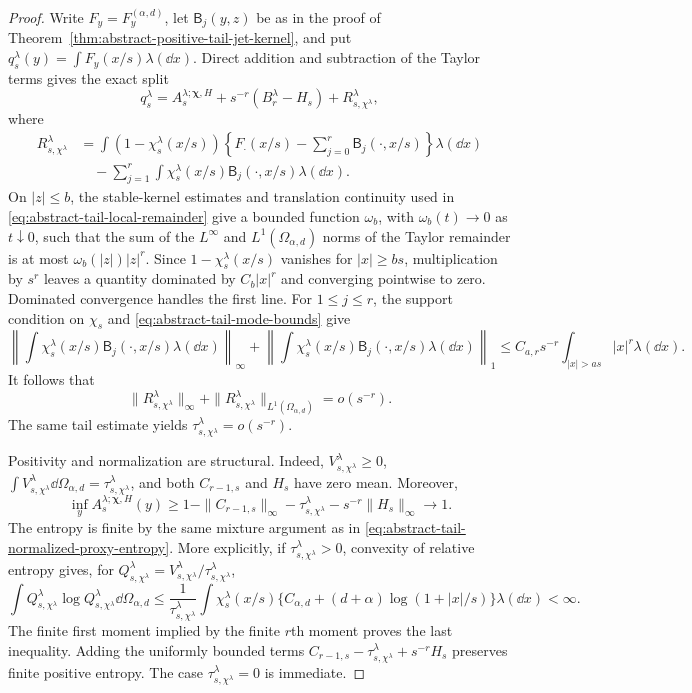 \begin{proof}
Write \(F_y=F_y^{(\alpha,d)}\), let \(\mathsf B_j(y,z)\) be as in the proof
of Theorem~\ref{thm:abstract-positive-tail-jet-kernel}, and put
\(q_s^\lambda(y)=\int F_y(x/s)\lambda(\dd x)\).  Direct addition and
subtraction of the Taylor terms gives the exact split
\[
 q_s^\lambda=A_s^{\lambda;\boldsymbol\chi,H}
  +s^{-r}(B_r^\lambda-H_s)+R_{s,\chi^\lambda}^\lambda,
\]
where
\begin{align*}
 R_{s,\chi^\lambda}^\lambda
 &=\int(1-\chi_s^\lambda(x/s))
   \left\{F_\cdot(x/s)-\sum_{j=0}^r
                  \mathsf B_j(\cdot,x/s)\right\}\lambda(\dd x)\\
 &\quad-\sum_{j=1}^r\int\chi_s^\lambda(x/s)
                  \mathsf B_j(\cdot,x/s)\lambda(\dd x).
\end{align*}
On \(|z|\le b\), the stable-kernel estimates and translation continuity
used in \eqref{eq:abstract-tail-local-remainder} give a bounded function
\(\omega_b\), with \(\omega_b(t)\to0\) as \(t\downarrow0\), such that the
sum of the \(L^\infty\) and \(L^1(\Omega_{\alpha,d})\) norms of the Taylor
remainder is at most \(\omega_b(|z|)|z|^r\).  Since
\(1-\chi_s^\lambda(x/s)\)
vanishes for \(|x|\ge bs\), multiplication by \(s^r\) leaves a quantity
dominated by \(C_b|x|^r\) and converging pointwise to zero.  Dominated
convergence handles the first line.  For \(1\le j\le r\), the support
condition on \(\chi_s\) and \eqref{eq:abstract-tail-mode-bounds} give
\[
 \left\|\int\chi_s^\lambda(x/s)\mathsf B_j(\cdot,x/s)
             \lambda(\dd x)\right\|_\infty
 +\left\|\int\chi_s^\lambda(x/s)\mathsf B_j(\cdot,x/s)
             \lambda(\dd x)\right\|_1
 \le C_{a,r}s^{-r}\int_{|x|>as}|x|^r\lambda(\dd x).
\]
It follows that
\[
 \|R_{s,\chi^\lambda}^\lambda\|_\infty+
 \|R_{s,\chi^\lambda}^\lambda\|_{L^1(\Omega_{\alpha,d})}=o(s^{-r}).
\]
The same tail estimate yields
\(\tau_{s,\chi^\lambda}^\lambda=o(s^{-r})\).

Positivity and normalization are structural.  Indeed,
\(V_{s,\chi^\lambda}^\lambda\ge0\),
\(\int V_{s,\chi^\lambda}^\lambda\dd\Omega_{\alpha,d}
=\tau_{s,\chi^\lambda}^\lambda\), and both \(C_{r-1,s}\) and \(H_s\) have zero
mean.  Moreover,
\[
 \inf_yA_s^{\lambda;\boldsymbol\chi,H}(y)
 \ge1-\|C_{r-1,s}\|_\infty-
       \tau_{s,\chi^\lambda}^\lambda-s^{-r}\|H_s\|_\infty\longrightarrow1.
\]
The entropy is finite by the same mixture argument as in
\eqref{eq:abstract-tail-normalized-proxy-entropy}.  More explicitly, if
\(\tau_{s,\chi^\lambda}^\lambda>0\), convexity of relative entropy gives,
for \(Q_{s,\chi^\lambda}^\lambda
=V_{s,\chi^\lambda}^\lambda/\tau_{s,\chi^\lambda}^\lambda\),
\[
 \int Q_{s,\chi^\lambda}^\lambda\log Q_{s,\chi^\lambda}^\lambda
       \dd\Omega_{\alpha,d}
 \le\frac1{\tau_{s,\chi^\lambda}^\lambda}
 \int\chi_s^\lambda(x/s)\{C_{\alpha,d}+(d+\alpha)
              \log(1+|x|/s)\}\lambda(\dd x)<\infty.
\]
The finite first moment implied by the finite \(r\)th moment proves the last
inequality.  Adding the uniformly bounded terms
\(C_{r-1,s}-\tau_{s,\chi^\lambda}^\lambda+s^{-r}H_s\) preserves finite
positive entropy.  The case \(\tau_{s,\chi^\lambda}^\lambda=0\) is
immediate.


\end{proof}
